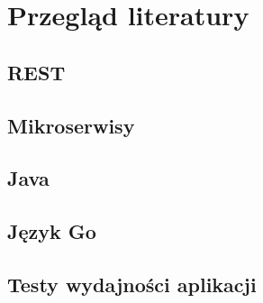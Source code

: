 \chapter{Przegląd literatury}

\section{REST}


\section{Mikroserwisy}


\section{Java}


\section{Język Go}


\section{Testy wydajności aplikacji}